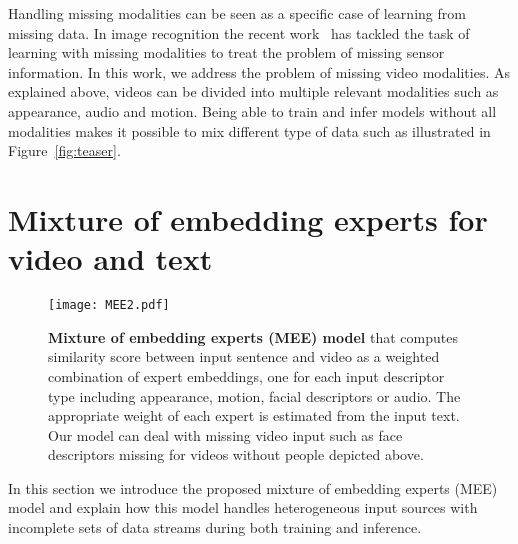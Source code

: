 \documentclass[runningheads]{llncs}
\begin{document}
Handling missing modalities can be seen as a specific case of learning from missing data. In image recognition the recent work~\cite{tran17missingmodalities} has tackled the task of learning with missing modalities to treat the problem of missing sensor information. In this work, we address the problem of missing video modalities. As explained above, videos can be divided into multiple relevant modalities such as appearance, audio and motion. Being able to train and infer models without all modalities makes it possible to mix different type of data such as illustrated in 
Figure~\ref{fig:teaser}.





\section{Mixture of embedding experts for video and text}




\begin{figure}[t]
  \begin{center}
     \texttt{[image: MEE2.pdf]}
\end{center}
\vspace{-0.5cm}
\caption{\small{\bf Mixture of embedding experts (MEE) model} that computes similarity score  between input sentence  and video  as a weighted combination of expert embeddings, one for each input descriptor type including appearance, motion, facial descriptors or audio. The appropriate weight of each expert is estimated from the input text. 
Our model can deal with missing video input such as face descriptors missing for videos without people depicted above.
}
\label{fig:separate_embd}
\end{figure}

In this section we introduce the proposed mixture of embedding experts (MEE) model and explain how this model handles heterogeneous input sources with incomplete sets of data streams during both training and inference.
\end{document}
